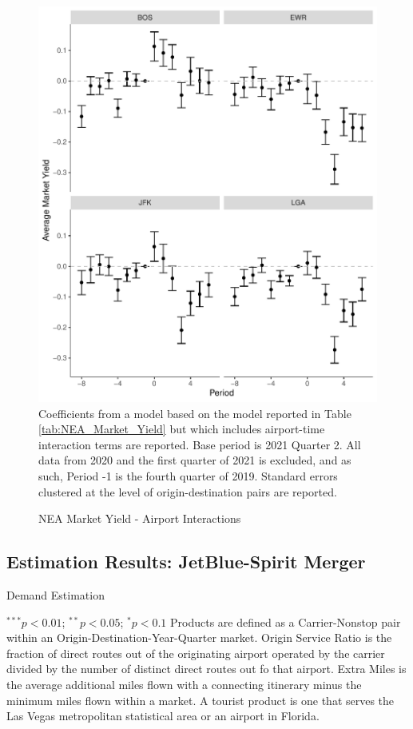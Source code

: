 \documentclass{article}
\begin{document}
\begin{appendices}
	\begin{figure}
		\caption{NEA Market Yield - Airport Interactions}
		\label{fig:NEA_Market_Yield_Interaction}
		\includegraphics[width = \linewidth]{NEA_Airport_Yield_Graph}
		\footnotesize{Coefficients from a model based on the model reported in Table \ref{tab:NEA_Market_Yield} but which includes airport-time interaction terms are reported. Base period is 2021 Quarter 2. All data from 2020 and the first quarter of 2021 is excluded, and as such, Period -1 is the fourth quarter of 2019. Standard errors clustered at the level of origin-destination pairs are reported. }
	\end{figure}	
	
	\subsection{Estimation Results: JetBlue-Spirit Merger}
	
	\begin{table}
		\caption{Demand Estimation}
		\label{tab:DemandEstimation_OriginalInstruments}
		
		\footnotesize{$^{***}p<0.01$; $^{**}p<0.05$; $^{*}p<0.1$ Products are defined as a Carrier-Nonstop pair within an Origin-Destination-Year-Quarter market. Origin Service Ratio is the fraction of direct routes out of the originating airport operated by the carrier divided by the number of distinct direct routes out fo that airport. Extra Miles is the average additional miles flown with a connecting itinerary minus the minimum miles flown within a market.  A tourist product is one that serves the Las Vegas metropolitan statistical area or an airport in Florida.}
	\end{table}
	

\end{appendices}
\end{document}
